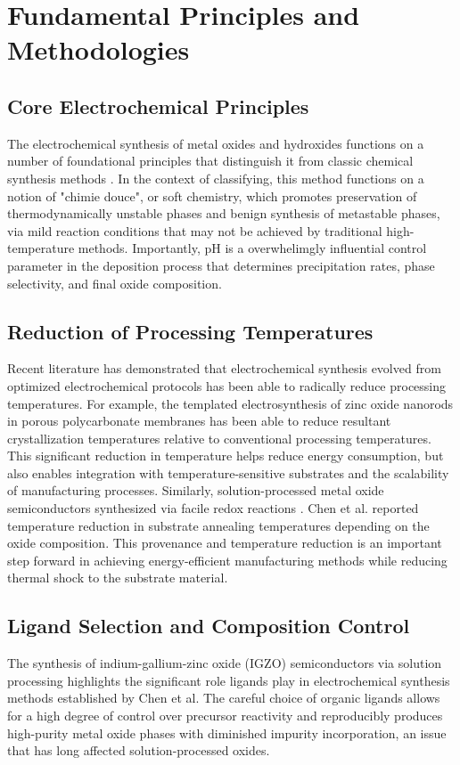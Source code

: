\documentclass[12pt,a4paper]{report}
\begin{document}
	\section{Fundamental Principles and Methodologies}
	 
	\subsection{Core Electrochemical Principles}
	The electrochemical synthesis of metal oxides and hydroxides functions on a number of foundational principles that distinguish it from classic chemical synthesis methods \cite{Therese2000}. In the context of classifying, this method functions on a notion of "chimie douce", or soft chemistry, which promotes preservation of thermodynamically unstable phases and benign synthesis of metastable phases, via mild reaction conditions that may not be achieved by traditional high-temperature methods. Importantly, pH is a overwhelimgly influential control parameter in the deposition process that determines precipitation rates, phase selectivity, and final oxide composition.
	
	\subsection{Reduction of Processing Temperatures}
	Recent literature has demonstrated that electrochemical synthesis evolved from optimized electrochemical protocols has been able to radically reduce processing temperatures. For example, the templated electrosynthesis of zinc oxide nanorods in porous polycarbonate membranes \cite{Lai2006} has been able to reduce resultant crystallization temperatures relative to conventional processing temperatures. This significant reduction in temperature helps reduce energy consumption, but also enables integration with temperature-sensitive substrates and the scalability of manufacturing processes.  
	Similarly, solution-processed metal oxide semiconductors synthesized via facile redox reactions \cite{Chen2015}. Chen et al. reported temperature reduction in substrate annealing temperatures depending on the oxide composition. This provenance and temperature reduction is an important step forward in achieving energy-efficient manufacturing methods while reducing thermal shock to the substrate material.
	
	
	\subsection{Ligand Selection and Composition Control}
	The synthesis of indium-gallium-zinc oxide (IGZO) semiconductors via solution processing highlights the significant role ligands play in electrochemical synthesis methods established by Chen et al. The careful choice of organic ligands allows for a high degree of control over precursor reactivity and reproducibly produces high-purity metal oxide phases with diminished impurity incorporation, an issue that has long affected solution-processed oxides.
	
\end{document}
